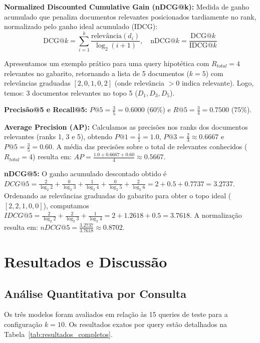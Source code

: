 \documentclass[12pt]{article}
\begin{document}
\noindent\textbf{Normalized Discounted Cumulative Gain (nDCG@k):} Medida de ganho acumulado que penaliza documentos relevantes posicionados tardiamente no rank, normalizado pelo ganho ideal acumulado (IDCG):
\begin{equation}
    \text{DCG}@k = \sum_{i=1}^{k} \frac{\text{relevância}(d_i)}{\log_2(i + 1)}, \quad \text{nDCG}@k = \frac{\text{DCG}@k}{\text{IDCG}@k}
\end{equation}

Apresentamos um exemplo prático para uma query hipotética com $R_{total} = 4$ relevantes no gabarito, retornando a lista de 5 documentos ($k=5$) com relevâncias graduadas $[2, 0, 1, 0, 2]$ (onde relevância $> 0$ indica relevante). Logo, temos: 3 documentos relevantes no topo 5 ($D_1, D_3, D_5$).

\noindent\textbf{Precisão@5 e Recall@5:} $P@5 = \frac{3}{5} = 0.6000$ ($60\%$) e $R@5 = \frac{3}{4} = 0.7500$ ($75\%$).

\noindent\textbf{Average Precision (AP):} Calculamos as precisões nos ranks dos documentos relevantes (ranks 1, 3 e 5), obtendo $P@1 = \frac{1}{1} = 1.0$, $P@3 = \frac{2}{3} \approx 0.6667$ e $P@5 = \frac{3}{5} = 0.60$. A média das precisões sobre o total de relevantes conhecidos ($R_{total} = 4$) resulta em: $AP = \frac{1.0 + 0.6667 + 0.60}{4} \approx 0.5667$.

\noindent\textbf{nDCG@5:} O ganho acumulado descontado obtido é $DCG@5 = \frac{2}{\log_2 2} + \frac{0}{\log_2 3} + \frac{1}{\log_2 4} + \frac{0}{\log_2 5} + \frac{2}{\log_2 6} = 2 + 0.5 + 0.7737 = 3.2737$. Ordenando as relevâncias graduadas do gabarito para obter o topo ideal ($[2, 2, 1, 0, 0]$), computamos $IDCG@5 = \frac{2}{\log_2 2} + \frac{2}{\log_2 3} + \frac{1}{\log_2 4} = 2 + 1.2618 + 0.5 = 3.7618$. A normalização resulta em: $nDCG@5 = \frac{3.2737}{3.7618} \approx 0.8702$.

\section{Resultados e Discussão}

\subsection{Análise Quantitativa por Consulta}

Os três modelos foram avaliados em relação às 15 queries de teste para a configuração $k=10$. Os resultados exatos por query estão detalhados na Tabela~\ref{tab:resultados_completos}.
\end{document}
